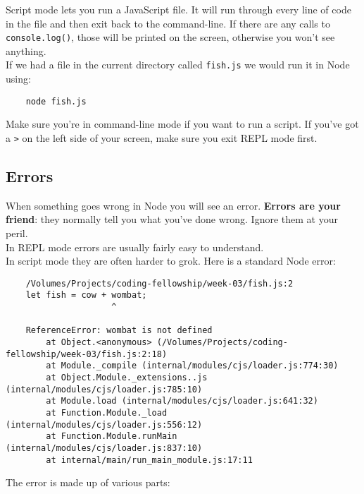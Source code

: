 Script mode lets you run a JavaScript file. It will run through every line of code in the file and then exit back to the command-line. If there are any calls to \texttt{console.log()}, those will be printed on the screen, otherwise you won't see anything.
\\

If we had a file in the current directory called \texttt{fish.js} we would run it in Node using:

\begin{verbatim}
    node fish.js
\end{verbatim}

Make sure you're in command-line mode if you want to run a script. If you've got a \texttt{>} on the left side of your screen, make sure you exit REPL mode first.

\pagebreak

\subsection{Errors}

When something goes wrong in Node you will see an error. \textbf{Errors are your friend}: they normally tell you what you've done wrong. Ignore them at your peril.
\\

In REPL mode errors are usually fairly easy to understand.
\\

In script mode they are often harder to grok. Here is a standard Node error:

\begin{verbatim}
    /Volumes/Projects/coding-fellowship/week-03/fish.js:2
    let fish = cow + wombat;
                     ^

    ReferenceError: wombat is not defined
        at Object.<anonymous> (/Volumes/Projects/coding-fellowship/week-03/fish.js:2:18)
        at Module._compile (internal/modules/cjs/loader.js:774:30)
        at Object.Module._extensions..js (internal/modules/cjs/loader.js:785:10)
        at Module.load (internal/modules/cjs/loader.js:641:32)
        at Function.Module._load (internal/modules/cjs/loader.js:556:12)
        at Function.Module.runMain (internal/modules/cjs/loader.js:837:10)
        at internal/main/run_main_module.js:17:11
\end{verbatim}

The error is made up of various parts:

